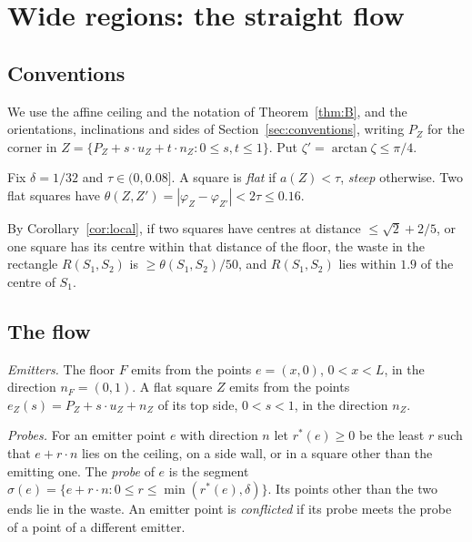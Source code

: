 \documentclass[11pt,letterpaper]{amsart}
\theoremstyle{plain}
\theoremstyle{definition}
\theoremstyle{remark}
\begin{document}
\section{Wide regions: the straight flow}\label{sec:straight}
\subsection{Conventions}
We use the affine ceiling and the notation of Theorem~\ref{thm:B}, and the orientations, inclinations and sides of Section~\ref{sec:conventions}, writing $P_Z$ for the corner in $Z=\{P_Z+s\cdot u_Z+t\cdot n_Z:0\le s,t\le1\}$. Put $\zeta'=\arctan\zeta\le\pi/4$.

Fix $\delta=1/32$ and $\tau\in(0,0.08]$. A square is \emph{flat} if $a(Z)<\tau$, \emph{steep} otherwise. Two flat squares have $\theta(Z,Z')=|\varphi_Z-\varphi_{Z'}|<2\tau\le0.16$.

By Corollary~\ref{cor:local}, if two squares have centres at distance $\le\sqrt2+2/5$, or one square has its centre within that distance of the floor, the waste in the rectangle $R(S_1,S_2)$ is $\ge\theta(S_1,S_2)/50$, and $R(S_1,S_2)$ lies within $1.9$ of the centre of $S_1$.

\subsection{The flow}
\emph{Emitters.} The floor $F$ emits from the points $e=(x,0)$, $0<x<L$, in the direction $n_F=(0,1)$. A flat square $Z$ emits from the points $e_Z(s)=P_Z+s\cdot u_Z+n_Z$ of its top side, $0<s<1$, in the direction $n_Z$.

\emph{Probes.} For an emitter point $e$ with direction $n$ let $r^*(e)\ge0$ be the least $r$ such that $e+r\cdot n$ lies on the ceiling, on a side wall, or in a square other than the emitting one. The \emph{probe} of $e$ is the segment $\sigma(e)=\{e+r\cdot n:0\le r\le\min(r^*(e),\delta)\}$. Its points other than the two ends lie in the waste. An emitter point is \emph{conflicted} if its probe meets the probe of a point of a different emitter.
\end{document}
